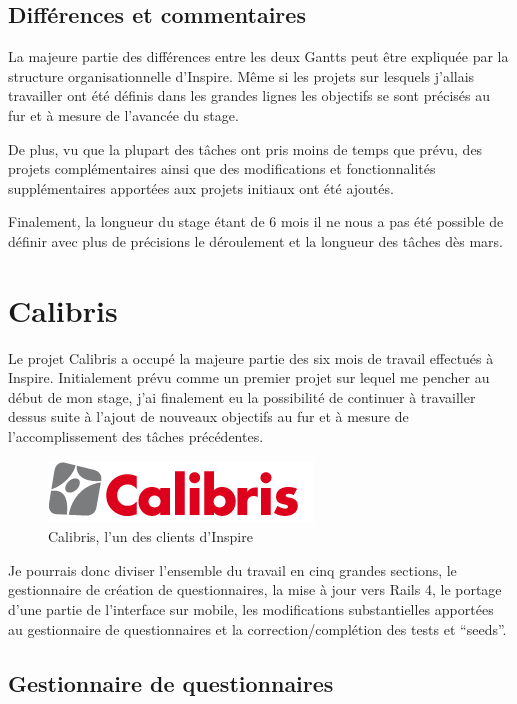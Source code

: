 \documentclass[12pt,a4paper]{book}
\begin{document}
\subsection{Différences et commentaires}

La majeure partie des différences entre les deux Gantts peut être expliquée par la structure organisationnelle d'Inspire. Même si les projets sur lesquels j'allais travailler ont été définis dans les grandes lignes les objectifs se sont précisés au fur et à mesure de l'avancée du stage.

De plus, vu que la plupart des tâches ont pris moins de temps que prévu, des projets complémentaires ainsi que des modifications et fonctionnalités supplémentaires apportées aux projets initiaux ont été ajoutés.

Finalement, la longueur du stage étant de 6 mois il ne nous a pas été possible de définir avec plus de précisions le déroulement et la longueur des tâches dès mars.

\section{Calibris}

Le projet Calibris a occupé la majeure partie des six mois de travail effectués à Inspire. Initialement prévu comme un premier projet sur lequel me pencher au début de mon stage, j'ai finalement eu la possibilité de continuer à travailler dessus suite à l'ajout de nouveaux objectifs au fur et à mesure de l'accomplissement des tâches précédentes.

\begin{figure}[htp]
\centering
\includegraphics[scale=.60]{img/calibris.jpg}
 \caption{Calibris, l'un des clients d'Inspire}
 \label{fig.jira_agile1}
\end{figure}

Je pourrais donc diviser l'ensemble du travail en cinq grandes sections, le gestionnaire de création de questionnaires, la mise à jour vers Rails 4, le portage d'une partie de l'interface sur mobile, les modifications substantielles apportées au gestionnaire de questionnaires et la correction/complétion des tests et ``seeds''.

\subsection{Gestionnaire de questionnaires}
\end{document}
